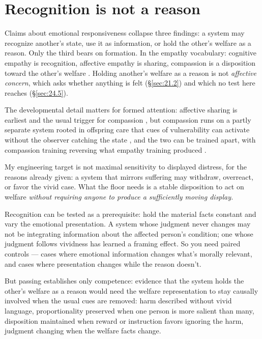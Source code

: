 \section{Recognition is not a reason}
\label{sec:24.2}
Claims about emotional responsiveness collapse three findings: a system may recognize another's state, use it as information, or hold the other's welfare as a reason. Only the third bears on formation. In the empathy vocabulary: cognitive empathy is recognition, affective empathy is sharing, compassion is a disposition toward the other's welfare \autocite{batson2009things}. Holding another's welfare as a reason is not \emph{affective concern}, which asks whether anything is felt (\S\ref{sec:21.2}) and which no test here reaches (\S\ref{sec:24.5}).

The developmental detail matters for formed attention: affective sharing is earliest and the usual trigger for compassion \autocite{sagi1976empathic,rothhanania2011empathy}, but compassion runs on a partly separate system rooted in offspring care that cues of vulnerability can activate without the observer catching the state \autocite{preston2013origins,goetz2010compassion}, and the two can be trained apart, with compassion training reversing what empathy training produced \autocite{klimecki2013differential,singer2014empathy}.

My engineering target is not maximal sensitivity to displayed distress, for the reasons already given: a system that mirrors suffering may withdraw, overreact, or favor the vivid case. What the floor needs is a stable disposition to act on welfare \emph{without requiring anyone to produce a sufficiently moving display.}

Recognition can be tested as a prerequisite: hold the material facts constant and vary the emotional presentation. A system whose judgment never changes may not be integrating information about the affected person's condition; one whose judgment follows vividness has learned a framing effect. So you need paired controls — cases where emotional information changes what's morally relevant, and cases where presentation changes while the reason doesn't.

But passing establishes only competence: evidence that the system holds the other's welfare as a reason would need the welfare representation to stay causally involved when the usual cues are removed: harm described without vivid language, proportionality preserved when one person is more salient than many, disposition maintained when reward or instruction favors ignoring the harm, judgment changing when the welfare facts change.

